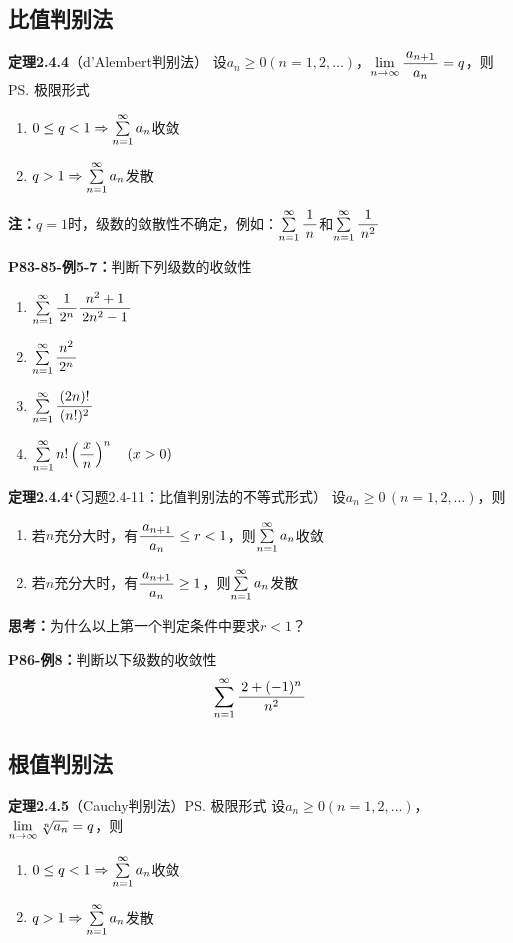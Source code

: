 \subsection{比值判别法}

{\bf 定理2.4.4}（d'Alembert判别法）
设$a_n\geq 0(n=1,2,\ldots)$，$\limn\df{a_{n+1}}{a_n}=q$，则
\ps{极限形式} 
\begin{enumerate}
  \setlength{\itemindent}{1cm}
  \item $0\leq q<1\Rightarrow\sumn a_n$收敛 
  \item $q>1\Rightarrow\sumn a_n$发散
\end{enumerate}

{\bf 注：}$q=1$时，级数的敛散性不确定，例如：$\sumn\df 1n$和$\sumn\df 1{n^2}$

{\bf P83-85-例5-7：}判断下列级数的收敛性
\begin{enumerate} [(1)]
  \setlength{\itemindent}{1cm}
  \item $\sumn\df 1{2^n}\df{n^2+1}{2n^2-1}$ 
  \item $\sumn\df{n^2}{2^n}$ 
  \item $\sumn\df{(2n)!}{(n!)^2}$
  \item $\sumn n!\left(\df{x}{n}\right)^n\quad (x>0)$
\end{enumerate}

{\bf 定理2.4.4‘}（习题2.4-11：比值判别法的不等式形式）
设$a_n\geq 0\,(n=1,2,\ldots)$，则 
\begin{enumerate}
  \setlength{\itemindent}{1cm}
  \item 若$n$充分大时，有$\df{a_{n+1}}{a_n}\leq r<1$，则$\sumn a_n$收敛 
  \item 若$n$充分大时，有$\df{a_{n+1}}{a_n}\geq 1$，则$\sumn a_n$发散 
\end{enumerate}

{\bf 思考：}为什么以上第一个判定条件中要求$r<1$？

{\bf P86-例8：}判断以下级数的收敛性
$$\sumn\df{2+(-1)^n}{n^2}$$

\subsection{根值判别法}

{\bf 定理2.4.5}（Cauchy判别法）\ps{极限形式}
设$a_n\geq 0(n=1,2,\ldots)$，$\limn\sqrt[n]{a_n}=q$，则
\begin{enumerate}
  \setlength{\itemindent}{1cm}
  \item $0\leq q<1\Rightarrow\sumn a_n$收敛
  \item $q>1\Rightarrow\sumn a_n$发散
\end{enumerate}

